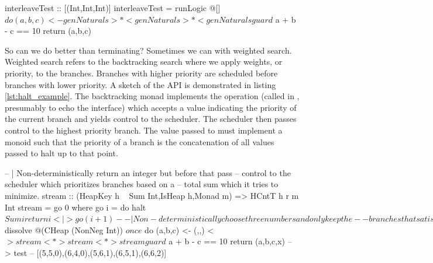 \begin{code}
\begin{haskellcode}
interleaveTest :: [(Int,Int,Int)]
interleaveTest = runLogic @[] $ do
  (a,b,c) <- genNaturals >*< genNaturals >*< genNaturals
  guard $ a + b - c == 10
  return (a,b,c)
\end{haskellcode}
  \caption{\label{lst:interl_logic_example}Interleaving (in this
    example \hask{>*<}) is not \emph{actually} fair in the sense that
    it does not give all the processes}
\end{code}

So can we do better than terminating? Sometimes we can with weighted
search. Weighted search refers to the backtracking search where we
apply weights, or priority, to the branches. Branches with higher
priority are scheduled before branches with lower priority. A sketch
of the API is demonstrated in listing \ref{lst:halt_example}. The
backtracking monad implements the  operation (called
 in \cite{kidneyAlgebrasWeightedSearch2021}, presumably to
echo the  interface) which accepts a value
indicating the priority of the current branch and yields control to
the scheduler. The scheduler then passes control to the highest
priority branch. The value passed to  must implement a
monoid such that the priority of a branch is the concatenation of all
values passed to halt up to that point.

\begin{code}
\begin{haskellcode}
  -- | Non-deterministically return an integer but before that pass
  -- control to the scheduler which prioritizes branches based on a
  -- total sum which it tries to minimize.
  stream :: (HeapKey h ~ Sum Int,IsHeap h,Monad m) => HCntT h r m Int
  stream = go 0 where
    go i = do
      halt $ Sum i
      return i <|> go (i+1)

  -- | Non-deterministically choose three numbers and only keep the
  -- branches that satisfy a + b - c == 10. Avoid diverging by prefering
  -- branches for which the sum of the numbers is minimum.
  test2 :: IO [(Int,Int,Int)]
  test2 = takeListT 5 $ dissolve @(CHeap (NonNeg Int)) $ once $ do
    (a,b,c) <- (,,) <$> stream <*> stream <*> stream
    guard $ a + b - c == 10
    return (a,b,c,x)
  -- > test
  -- [(5,5,0),(6,4,0),(5,6,1),(6,5,1),(6,6,2)]
\end{haskellcode}
  \caption{\label{lst:halt_example}Prioritise branches that we want to
    be executed first.}
\end{code}

